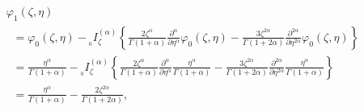 \documentclass[10pt]{NSP1}
\begin{document}
\begin{equation}
\label{eq44}
\begin{array}{llllll}
 \varphi _1 \left( {\zeta ,\eta } \right) \\
\;\; =\varphi _0 \left( {\zeta ,\eta } \right)-{ }_{_0 }I_\zeta ^{\left( \alpha
\right)}\left\{ {\frac{2\zeta ^\alpha }{\Gamma \left( {1+\alpha }
\right)}\frac{\partial ^\alpha }{\partial \eta ^\alpha }\varphi _0 \left(
{\zeta ,\eta } \right)-\frac{3\zeta ^{2\alpha }}{\Gamma \left( {1+2\alpha }
\right)}\frac{\partial ^{2\alpha }}{\partial \eta ^{2\alpha }}\varphi _0
\left( {\zeta ,\eta } \right)} \right\} \\
\;\; =\frac{\eta ^\alpha }{\Gamma \left( {1+\alpha } \right)}-{ }_{_0 }I_\zeta
^{\left( \alpha \right)}\left\{ {\frac{2\zeta ^\alpha }{\Gamma \left(
{1+\alpha } \right)}\frac{\partial ^\alpha }{\partial \eta ^\alpha
}\frac{\eta ^\alpha }{\Gamma \left( {1+\alpha } \right)}-\frac{3\zeta
^{2\alpha }}{\Gamma \left( {1+2\alpha } \right)}\frac{\partial ^{2\alpha
}}{\partial \eta ^{2\alpha }}\frac{\eta ^\alpha }{\Gamma \left( {1+\alpha }
\right)}} \right\} \\
\;\; =\frac{\eta ^\alpha }{\Gamma \left( {1+\alpha } \right)}-\frac{2\zeta
^{2\alpha }}{\Gamma \left( {1+2\alpha } \right)} ,
 \end{array}
\end{equation}
\end{document}
